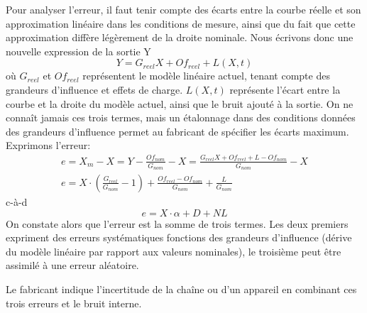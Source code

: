 Pour analyser l'erreur, il faut tenir compte des écarts entre la courbe réelle et son approximation linéaire dans les conditions de mesure, ainsi que du fait que cette approximation diffère légèrement de la droite nominale. Nous écrivons donc une nouvelle expression de la sortie Y
\begin{equation}
Y = G_{reel}X + Of_{reel} + L(X,t)
\end{equation}
où $G_{reel}$ et $Of_{reel}$ représentent le modèle linéaire actuel, tenant compte des grandeurs d'influence et effets de charge. $L(X,t)$ représente l'écart entre la courbe et la droite du modèle actuel, ainsi que le bruit ajouté à la sortie. On ne connaît jamais ces trois termes, mais un étalonnage dans des conditions données des grandeurs d'influence permet au fabricant de spécifier les écarts maximum. Exprimons l'erreur:
\begin{gather}
e = X_m - X =  Y - \frac{Of_{nom}}{G_{nom}} - X = \frac{G_{reel}X + Of_{reel} + L -Of_{nom}}{G_{nom}} - X\\
e = X \cdot(\frac{G_{reel}}{G_{nom}}   - 1) +  \frac{Of_{reel} - Of_{nom}}{G_{nom}}   +  \frac{L}{G_{nom}}
\end{gather}
c-à-d
\begin{equation}
e = X \cdot \alpha  + D + NL
\end{equation}
On constate alors que l'erreur est la somme de trois termes. Les deux premiers expriment des erreurs systématiques fonctions des grandeurs d'influence (dérive du modèle linéaire par rapport aux valeurs nominales), le troisième peut être assimilé à une erreur aléatoire.
\begin{center}
\end{center}
Le fabricant indique l'incertitude de la chaîne ou d'un appareil en combinant ces trois erreurs et le bruit interne.

